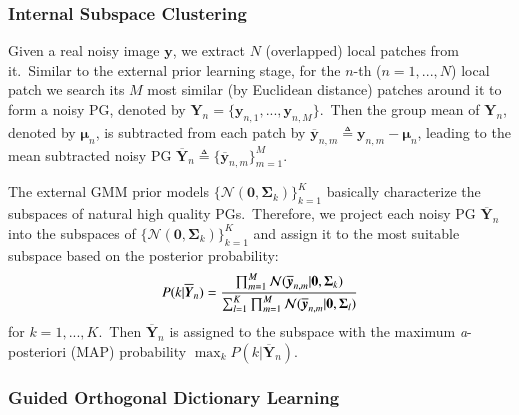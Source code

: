 \subsubsection{Internal Subspace Clustering}

Given a real noisy image $\mathbf{y}$, we extract $N$ (overlapped) local patches from it.\ Similar to the external prior learning stage, for the $n$-th ($n=1,...,N$) local patch we search its $M$ most similar (by Euclidean distance) patches around it to form a noisy PG, denoted by $\bm{Y}_{n} = \{\mathbf{y}_{n,1},...,\mathbf{y}_{n,M}\}$.\ Then the group mean of $\bm{Y}_{n}$, denoted by $\bm{\mu}_{n}$, is subtracted from each patch by $\bm{\overline{y}}_{n,m}\triangleq\mathbf{y}_{n,m}-\bm{\mu}_{n}$, leading to the mean subtracted noisy PG $\bm{\overline{Y}}_{n}\triangleq \{\bm{\overline{y}}_{n,m}\}_{m=1}^{M}$.

The external GMM prior models $\{\mathcal{N}(\bm{0},\bm{\Sigma}_{k})\}_{k=1}^{K}$ basically characterize the subspaces of natural high quality PGs.\ Therefore, we project each noisy PG $\bm{\overline{Y}}_{n}$ into the subspaces of $\{\mathcal{N}(\bm{0},\bm{\Sigma}_{k})\}_{k=1}^{K}$ and assign it to the most suitable subspace based on the posterior probability:
\vspace{-2mm}
\begin{equation}\label{equ3-3}
\vspace{-2mm}
P(k|\bm{\overline{Y}}_{n})=\frac{\prod_{m=1}^{M}\mathcal{N}(\bm{\overline{y}}_{n,m}|\bm{0},\bm{\Sigma}_{k})}{\sum_{l=1}^{K}\prod_{m=1}^{M}\mathcal{N}(\bm{\overline{y}}_{n,m}|\bm{0},\bm{\Sigma}_{l})}
\end{equation}
for $k=1,...,K$.\ Then $\bm{\overline{Y}}_{n}$ is assigned to the subspace with the maximum \emph{a}-posteriori (MAP) probability $\max_{k}P(k|\bm{\overline{Y}}_{n})$.


\subsubsection{Guided Orthogonal Dictionary Learning}

